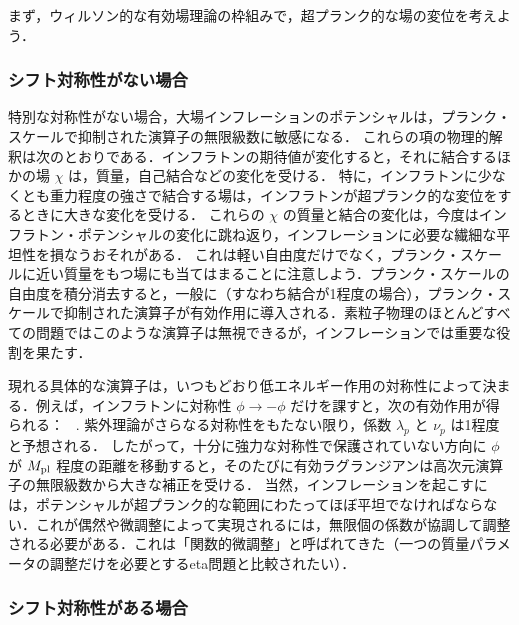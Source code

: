 \label{sec:EFT}

まず，ウィルソン的な有効場理論の枠組みで，超プランク的な場の変位を考えよう．

\subsubsection{シフト対称性がない場合}

特別な対称性がない場合，大場インフレーションのポテンシャルは，プランク・スケールで抑制された演算子の無限級数に敏感になる．
これらの項の物理的解釈は次のとおりである．インフラトンの期待値が変化すると，それに結合するほかの場 $\chi$ は，質量，自己結合などの変化を受ける．
特に，インフラトンに少なくとも重力程度の強さで結合する場は，インフラトンが超プランク的な変位をするときに大きな変化を受ける．
これらの $\chi$ の質量と結合の変化は，今度はインフラトン・ポテンシャルの変化に跳ね返り，インフレーションに必要な繊細な平坦性を損なうおそれがある．
これは軽い自由度だけでなく，プランク・スケールに近い質量をもつ場にも当てはまることに注意しよう．プランク・スケールの自由度を積分消去すると，一般に（すなわち結合が1程度の場合），プランク・スケールで抑制された演算子が有効作用に導入される．素粒子物理のほとんどすべての問題ではこのような演算子は無視できるが，インフレーションでは重要な役割を果たす．

現れる具体的な演算子は，いつもどおり低エネルギー作用の対称性によって決まる．例えば，インフラトンに対称性 $\phi \to - \phi$ だけを課すと，次の有効作用が得られる：
\beq
{}\ .
\eeq
紫外理論がさらなる対称性をもたない限り，係数 $\lambda_p$ と $\nu_p$ は1程度と予想される．
したがって，十分に強力な対称性で保護されていない方向に $\phi$ が $M_{\rm pl}$ 程度の距離を移動すると，そのたびに有効ラグランジアンは高次元演算子の無限級数から大きな補正を受ける．
当然，インフレーションを起こすには，ポテンシャルが超プランク的な範囲にわたってほぼ平坦でなければならない．これが偶然や微調整によって実現されるには，無限個の係数が協調して調整される必要がある．これは「関数的微調整」と呼ばれてきた（一つの質量パラメータの調整だけを必要とするeta問題と比較されたい）．


\subsubsection{シフト対称性がある場合}

